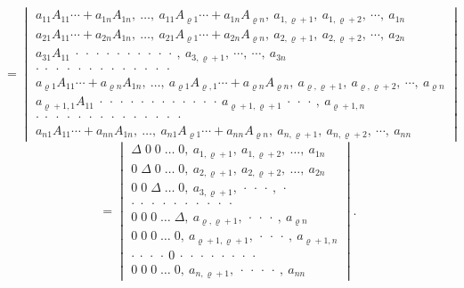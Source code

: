 \documentclass[11pt]{article}
\let\Delta\varDelta
\begin{document}
\[
=
\begin{vmatrix}
a_{11}A_{11}\cdots+a_{1n}A_{1n},\ \ldots,\ a_{11}A_{\varrho1}\cdots+a_{1n}A_{\varrho n},\ a_{1,\varrho+1},\ a_{1,\varrho+2},\ \cdots,\ a_{1n} \\
a_{21}A_{11}\cdots+a_{2n}A_{1n},\ \ldots,\ a_{21}A_{\varrho1}\cdots+a_{2n}A_{\varrho n},\ a_{2,\varrho+1},\ a_{2,\varrho+2},\ \cdots,\ a_{2n} \\
a_{31}A_{11}\ \cdot\ \cdot\ \cdot\ \cdot\ \cdot\ \cdot\ \cdot\ \cdot\ \cdot\ \cdot\ ,\ a_{3,\varrho+1},\ \cdots,\ \cdots,\ a_{3n} \\
\cdot\;\cdot\;\cdot\;\cdot\;\cdot\;\cdot\;\cdot\;\cdot\;\cdot\;\cdot\;\cdot\;\cdot\;\cdot \\
a_{\varrho1}A_{11}\cdots+a_{\varrho n}A_{1n},\ \ldots,\ a_{\varrho1}A_{\varrho,1}\cdots+a_{\varrho n}A_{\varrho n},\ a_{\varrho,\varrho+1},\ a_{\varrho,\varrho+2},\ \cdots,\ a_{\varrho n} \\
a_{\varrho+1,1}A_{11}\ \cdot\ \cdot\ \cdot\ \cdot\ \cdot\ \cdot\ \cdot\ \cdot\ \cdot\ \cdot\ \cdot\ \cdot\ a_{\varrho+1,\varrho+1}\ \cdot\ \cdot\ \cdot\ ,\ a_{\varrho+1,n} \\
\cdot\;\cdot\;\cdot\;\cdot\;\cdot\;\cdot\;\cdot\;\cdot\;\cdot\;\cdot\;\cdot\;\cdot\;\cdot\;\cdot \\
a_{n1}A_{11}\cdots+a_{nn}A_{1n},\ \ldots,\ a_{n1}A_{\varrho1}\cdots+a_{nn}A_{\varrho n},\ a_{n,\varrho+1},\ a_{n,\varrho+2},\ \cdots,\ a_{nn}
\end{vmatrix}
\]
\[
=
\begin{vmatrix}
\Delta\;0\;0\;\ldots\;0,\ a_{1,\varrho+1},\ a_{1,\varrho+2},\ \ldots,\ a_{1n} \\
0\;\Delta\;0\;\ldots\;0,\ a_{2,\varrho+1},\ a_{2,\varrho+2},\ \ldots,\ a_{2n} \\
0\;0\;\Delta\;\ldots\;0,\ a_{3,\varrho+1},\ \cdot\ \cdot\ \cdot\ ,\ \cdot \\
\cdot\;\cdot\;\cdot\;\cdot\;\cdot\;\cdot\;\cdot\;\cdot\;\cdot\;\cdot \\
0\;0\;0\;\ldots\;\Delta,\ a_{\varrho,\varrho+1},\ \cdot\ \cdot\ \cdot\ ,\ a_{\varrho n} \\
0\;0\;0\;\ldots\;0,\ a_{\varrho+1,\varrho+1},\ \cdot\ \cdot\ \cdot\ ,\ a_{\varrho+1,n} \\
\cdot\ \cdot\ \cdot\ \cdot\ 0\ \cdot\ \cdot\ \cdot\ \cdot\ \cdot\ \cdot\ \cdot\ \cdot \\
0\;0\;0\;\ldots\;0,\ a_{n,\varrho+1},\ \cdot\ \cdot\ \cdot\ \cdot\ ,\ a_{nn}
\end{vmatrix}.
\]
\end{document}
